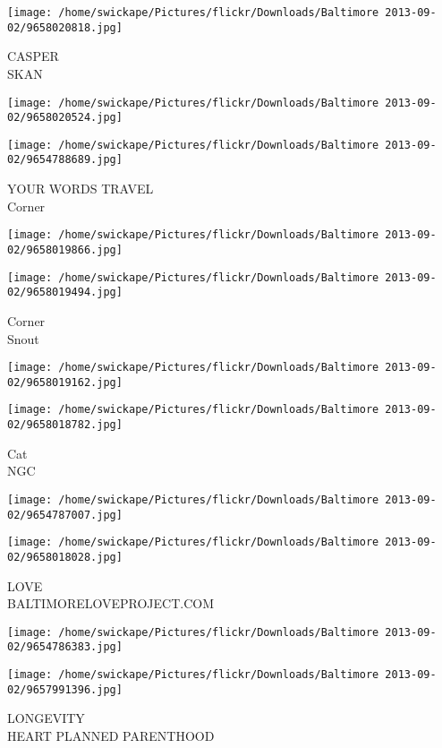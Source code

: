 \documentclass[10pt,letterpaper]{article}
\begin{document}
\vspace{0.25in}
\texttt{[image: /home/swickape/Pictures/flickr/Downloads/Baltimore 2013-09-02/9658020818.jpg]}

CASPER\\
SKAN
\pagebreak

\texttt{[image: /home/swickape/Pictures/flickr/Downloads/Baltimore 2013-09-02/9658020524.jpg]}

\vspace{0.25in}
\texttt{[image: /home/swickape/Pictures/flickr/Downloads/Baltimore 2013-09-02/9654788689.jpg]}

YOUR WORDS TRAVEL\\
Corner
\pagebreak

\texttt{[image: /home/swickape/Pictures/flickr/Downloads/Baltimore 2013-09-02/9658019866.jpg]}

\vspace{0.25in}
\texttt{[image: /home/swickape/Pictures/flickr/Downloads/Baltimore 2013-09-02/9658019494.jpg]}

Corner\\
Snout
\pagebreak

\texttt{[image: /home/swickape/Pictures/flickr/Downloads/Baltimore 2013-09-02/9658019162.jpg]}

\vspace{0.25in}
\texttt{[image: /home/swickape/Pictures/flickr/Downloads/Baltimore 2013-09-02/9658018782.jpg]}

Cat\\
NGC
\pagebreak

\texttt{[image: /home/swickape/Pictures/flickr/Downloads/Baltimore 2013-09-02/9654787007.jpg]}

\vspace{0.25in}
\texttt{[image: /home/swickape/Pictures/flickr/Downloads/Baltimore 2013-09-02/9658018028.jpg]}

LOVE\\
BALTIMORELOVEPROJECT.COM
\pagebreak

\texttt{[image: /home/swickape/Pictures/flickr/Downloads/Baltimore 2013-09-02/9654786383.jpg]}

\vspace{0.25in}
\texttt{[image: /home/swickape/Pictures/flickr/Downloads/Baltimore 2013-09-02/9657991396.jpg]}

LONGEVITY\\
HEART PLANNED PARENTHOOD
\pagebreak
\end{document}
